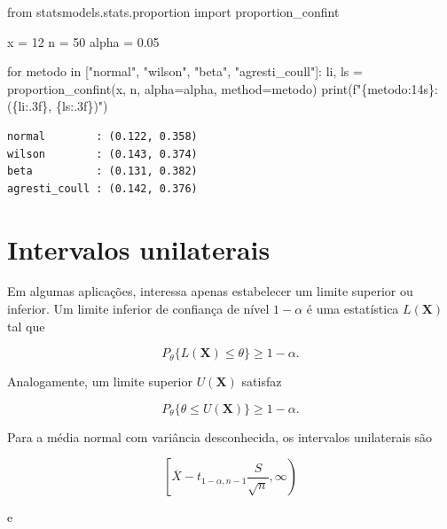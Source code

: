 \documentclass[
  letterpaper,
  DIV=11,
  numbers=noendperiod]{scrreprt}
\newenvironment{Shaded}{\begin{snugshade}}{\end{snugshade}}
\newcommand{\BuiltInTok}[1]{\textcolor[rgb]{0.00,0.23,0.31}{#1}}
\newcommand{\ControlFlowTok}[1]{\textcolor[rgb]{0.00,0.23,0.31}{#1}}
\newcommand{\DecValTok}[1]{\textcolor[rgb]{0.68,0.00,0.00}{#1}}
\newcommand{\FloatTok}[1]{\textcolor[rgb]{0.68,0.00,0.00}{#1}}
\newcommand{\ImportTok}[1]{\textcolor[rgb]{0.00,0.46,0.62}{#1}}
\newcommand{\KeywordTok}[1]{\textcolor[rgb]{0.00,0.23,0.31}{#1}}
\newcommand{\NormalTok}[1]{\textcolor[rgb]{0.00,0.23,0.31}{#1}}
\newcommand{\OperatorTok}[1]{\textcolor[rgb]{0.37,0.37,0.37}{#1}}
\newcommand{\SpecialCharTok}[1]{\textcolor[rgb]{0.37,0.37,0.37}{#1}}
\newcommand{\SpecialStringTok}[1]{\textcolor[rgb]{0.13,0.47,0.30}{#1}}
\newcommand{\StringTok}[1]{\textcolor[rgb]{0.13,0.47,0.30}{#1}}
\begin{document}
\begin{Shaded}
\begin{Highlighting}[]
\ImportTok{from}\NormalTok{ statsmodels.stats.proportion }\ImportTok{import}\NormalTok{ proportion\_confint}

\NormalTok{x }\OperatorTok{=} \DecValTok{12}
\NormalTok{n }\OperatorTok{=} \DecValTok{50}
\NormalTok{alpha }\OperatorTok{=} \FloatTok{0.05}

\ControlFlowTok{for}\NormalTok{ metodo }\KeywordTok{in}\NormalTok{ [}\StringTok{"normal"}\NormalTok{, }\StringTok{"wilson"}\NormalTok{, }\StringTok{"beta"}\NormalTok{, }\StringTok{"agresti\_coull"}\NormalTok{]:}
\NormalTok{    li, ls }\OperatorTok{=}\NormalTok{ proportion\_confint(x, n, alpha}\OperatorTok{=}\NormalTok{alpha, method}\OperatorTok{=}\NormalTok{metodo)}
    \BuiltInTok{print}\NormalTok{(}\SpecialStringTok{f"}\SpecialCharTok{\{}\NormalTok{metodo}\SpecialCharTok{:14s\}}\SpecialStringTok{: (}\SpecialCharTok{\{}\NormalTok{li}\SpecialCharTok{:.3f\}}\SpecialStringTok{, }\SpecialCharTok{\{}\NormalTok{ls}\SpecialCharTok{:.3f\}}\SpecialStringTok{)"}\NormalTok{)}
\end{Highlighting}
\end{Shaded}

\begin{verbatim}
normal        : (0.122, 0.358)
wilson        : (0.143, 0.374)
beta          : (0.131, 0.382)
agresti_coull : (0.142, 0.376)
\end{verbatim}

\section{Intervalos unilaterais}\label{intervalos-unilaterais}

Em algumas aplicações, interessa apenas estabelecer um limite superior
ou inferior. Um limite inferior de confiança de nível \(1-\alpha\) é uma
estatística \(L(\mathbf{X})\) tal que

\[P_\theta\{L(\mathbf{X})\leq\theta\}\geq1-\alpha.\]

Analogamente, um limite superior \(U(\mathbf{X})\) satisfaz

\[P_\theta\{\theta\leq U(\mathbf{X})\}\geq1-\alpha.\]

Para a média normal com variância desconhecida, os intervalos
unilaterais são

\[\left[
\overline X-t_{1-\alpha,n-1}\frac{S}{\sqrt n},\infty
\right)\]

e
\end{document}
